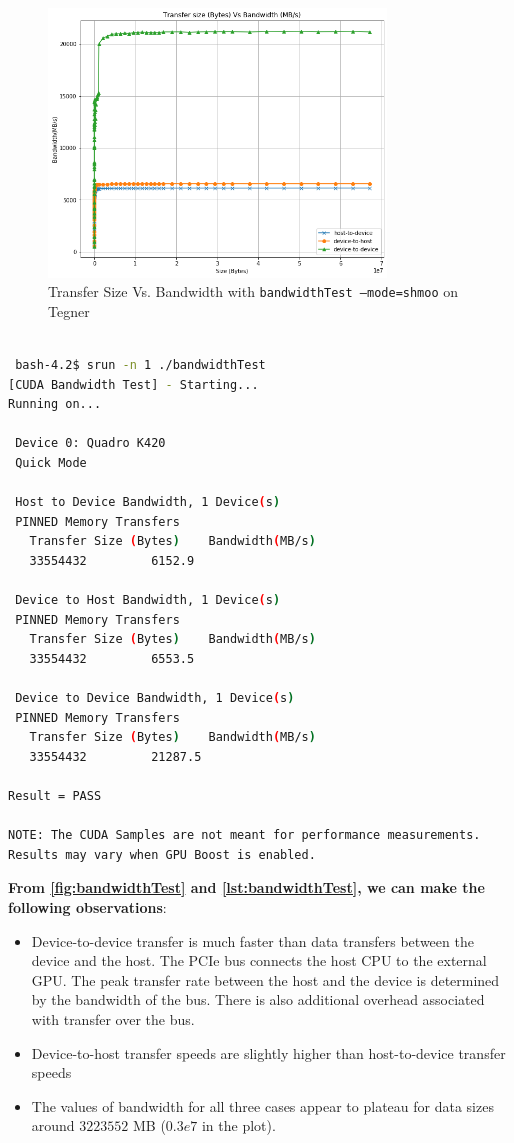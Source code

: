 \documentclass[12pt]{article}
\begin{document}
\begin{figure}[H]
\centering
\includegraphics[width=0.8\textwidth]{bandwidthTest.png}
\caption{Transfer Size Vs. Bandwidth with \texttt{bandwidthTest --mode=shmoo} on Tegner}
\label{fig:bandwidthTest}
\end{figure}

\begin{lstlisting}[language=bash, label={lst:bandwidthTest}, caption={bandwidthTest on Tegner}, captionpos=b]

 bash-4.2$ srun -n 1 ./bandwidthTest
[CUDA Bandwidth Test] - Starting...
Running on...

 Device 0: Quadro K420
 Quick Mode

 Host to Device Bandwidth, 1 Device(s)
 PINNED Memory Transfers
   Transfer Size (Bytes)	Bandwidth(MB/s)
   33554432			6152.9

 Device to Host Bandwidth, 1 Device(s)
 PINNED Memory Transfers
   Transfer Size (Bytes)	Bandwidth(MB/s)
   33554432			6553.5

 Device to Device Bandwidth, 1 Device(s)
 PINNED Memory Transfers
   Transfer Size (Bytes)	Bandwidth(MB/s)
   33554432			21287.5

Result = PASS

NOTE: The CUDA Samples are not meant for performance measurements.
Results may vary when GPU Boost is enabled.
\end{lstlisting}

\textbf{From \autoref{fig:bandwidthTest} and \autoref{lst:bandwidthTest}, we can make the following observations}:
\begin{itemize}
    \item Device-to-device transfer is much faster than data transfers between the device and the host. The PCIe bus connects the host CPU to the external GPU. The peak transfer rate between the host and the device is determined by the bandwidth of the bus. There is also additional overhead associated with transfer over the bus.
    \item Device-to-host transfer speeds are slightly higher than host-to-device transfer speeds
    \item The values of bandwidth for all three cases appear to plateau for data sizes around $3223552$ MB ($0.3e7$ in the plot).
\end{itemize}
\end{document}

